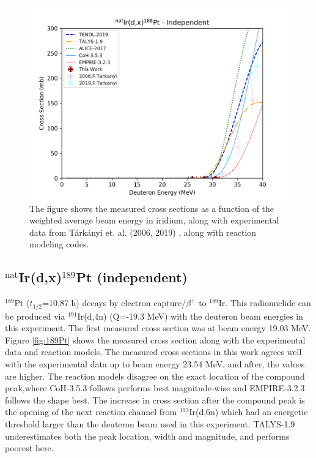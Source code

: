 \begin{figure}
    \centering
    \includegraphics{Results/Ir_188Pt.png}
    \caption{The figure shows the measured cross sections as a function of the weighted average beam energy in iridium, along with experimental data from Tárkányi et. al. (2006, 2019) \cite{Tarkanyi2006a, Tarkanyi2019}, along with reaction modeling codes. }
    \label{fig:188Pt}
\end{figure}

\subsection{$^\text{nat}$Ir(d,x)$^{189}$Pt (independent)}
$^{189}$Pt ($t_{1/2}$=10.87 h) decays by electron capture/$\beta^+$ to $^{189}$Ir. This radionuclide can be produced via $^{191}$Ir(d,4n) \cite{Johnson2017} (Q=-19.3 MeV) with the deuteron beam energies in this experiment. The first measured cross section was at beam energy 19.03 MeV. Figure \ref{fig:189Pt} shows the measured cross section along with the experimental data and reaction models. The measured cross sections in this work agrees well with the experimental data up to beam energy 23.54 MeV, and after, the values are higher. The reaction models disagree on the exact location of the compound peak,where CoH-3.5.3 follows performs best magnitude-wise and EMPIRE-3.2.3 follows the shape best. The increase in cross section after the compound peak is the opening of the next reaction channel from $^{193}$Ir(d,6n) which had an energetic threshold larger than the deuteron beam used in this experiment. TALYS-1.9 underestimates both the peak location, width and magnitude, and performs poorest here. \\

